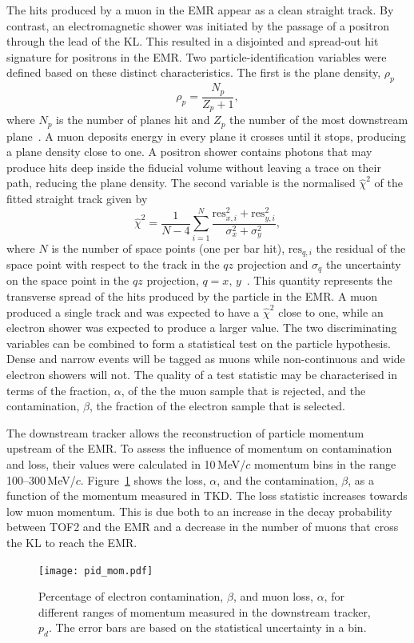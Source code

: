 The hits produced by a muon in the EMR appear as a clean straight
track.
By contrast, an electromagnetic shower was initiated by the passage of
a positron through the lead of the KL.
This resulted in a disjointed and spread-out hit signature for
positrons in the EMR.
Two particle-identification variables were defined based on these
distinct characteristics.
The first is the plane density, $\rho_p$
\begin{equation}
  \rho_p = \frac{N_p}{Z_p+1},
\end{equation}
where $N_p$ is the number of planes hit and $Z_p$ the number of the
most downstream plane~\cite{2015JInst..10P2012A}.
A muon deposits energy in every plane it crosses until it stops,
producing a plane density close to one.
A positron shower contains photons that may produce hits deep inside
the fiducial volume without leaving a trace on their path, reducing
the plane density.
The second variable is the normalised $\hat{\chi}^2$ of the fitted
straight track given by
\begin{equation}
  \hat{\chi}^2=\frac{1}{N-4}\sum_{i=1}^{N}\frac{\text{res}_{x,i}^2+\text{res}_{y,i}^2}{\sigma_x^2+\sigma_y^2},
\end{equation}
where $N$ is the number of space points (one per bar hit),
$\text{res}_{q,i}$ the residual of the space point with respect to the
track in the $qz$ projection and $\sigma_q$ the uncertainty on the
space point in the $qz$ projection, $q=x,\,y$~\cite{Drielsma:thesis}.
This quantity represents the transverse spread of the hits produced by
the particle in the EMR.
A muon produced a single track and was expected to have a
$\hat{\chi}^2$ close to one, while an electron shower was expected to
produce a larger value.
The two discriminating variables can be combined to form a statistical
test on the particle hypothesis. 
Dense and narrow events will be tagged as muons while non-continuous
and wide electron showers will not.  
The quality of a test statistic may be characterised in terms of the
fraction, $\alpha$, of the the muon sample that is rejected, and the 
contamination, $\beta$, the fraction of the electron sample that is
selected. 

The downstream tracker allows the reconstruction of particle momentum
upstream of the EMR. 
To assess the influence of momentum on contamination and loss, their
values were calculated in 10\,MeV/$c$ momentum bins in the range
100--300\,MeV/$c$.
Figure~\ref{fig:emr_pid_mom} shows the loss, $\alpha$, and the
contamination, $\beta$, as a function of the momentum measured in
TKD.
The loss statistic increases towards low muon momentum.
This is due both to an increase in the decay probability between TOF2
and the EMR and a decrease in the number of muons that cross the KL to
reach the EMR. 
\begin{figure}
  \begin{center}
    \texttt{[image: pid\_mom.pdf]}
  \end{center}
  \caption{
    Percentage of electron contamination, $\beta$, and muon loss,
    $\alpha$, for different ranges of momentum measured in the
    downstream tracker, $p_d$.
    The error bars are based on the statistical uncertainty in a bin.
  }
  \label{fig:emr_pid_mom}
\end{figure}
